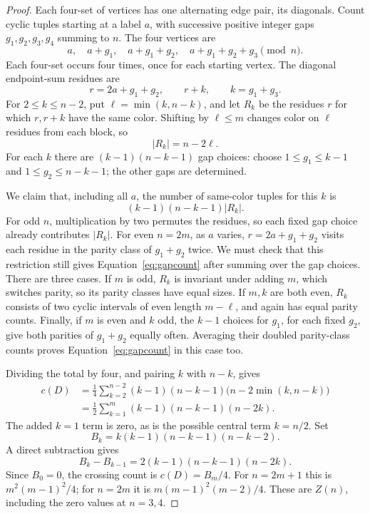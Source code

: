 \documentclass[11pt,a4paper]{article}
\theoremstyle{remark}
\numberwithin{equation}{section}
\begin{document}
\begin{proof}
Each four-set of vertices has one alternating edge pair, its
diagonals. Count cyclic tuples starting at a label \(a\), with
successive positive integer gaps \(g_1,g_2,g_3,g_4\) summing to \(n\).
The four vertices are
\[
 a,\quad a+g_1,\quad a+g_1+g_2,\quad a+g_1+g_2+g_3
 \pmod n.
\]
Each four-set occurs four times, once for each starting vertex.
The diagonal endpoint-sum residues are
\[
r=2a+g_1+g_2,\qquad r+k,\qquad k=g_1+g_3.
\]
For \(2\le k\le n-2\), put \(\ell=\min(k,n-k)\), and let \(R_k\)
be the residues \(r\) for which \(r,r+k\) have the same color.
Shifting by \(\ell\le m\) changes color on \(\ell\) residues from
each block, so
\[
|R_k|=n-2\ell.
\]
For each \(k\) there are \((k-1)(n-k-1)\) gap choices:
choose \(1\le g_1\le k-1\) and \(1\le g_2\le n-k-1\);
the other gaps are determined.

We claim that, including all \(a\), the number of same-color
tuples for this \(k\) is
\begin{equation}\label{eq:gapcount}
(k-1)(n-k-1)|R_k|.
\end{equation}
For odd \(n\), multiplication by two permutes the residues, so
each fixed gap choice already contributes \(|R_k|\).
For even \(n=2m\), as \(a\) varies, \(r=2a+g_1+g_2\) visits each
residue in the parity class of \(g_1+g_2\) twice. We must check that this restriction still gives
Equation~\eqref{eq:gapcount} after summing over the gap choices.
There are three cases.
If \(m\) is odd, \(R_k\) is invariant under adding \(m\), which
switches parity, so its parity classes have equal sizes.
If \(m,k\) are both even, \(R_k\) consists of two cyclic intervals
of even length \(m-\ell\), and again has equal parity counts.
Finally, if \(m\) is even and \(k\) odd, the \(k-1\) choices for
\(g_1\), for each fixed \(g_2\), give both parities of \(g_1+g_2\)
equally often. Averaging their doubled parity-class counts proves
Equation~\eqref{eq:gapcount} in this case too.

Dividing the total by four, and pairing \(k\) with \(n-k\), gives
\begin{align*}
c(D)
&=\frac14\sum_{k=2}^{n-2}
(k-1)(n-k-1)\bigl(n-2\min(k,n-k)\bigr)\\
&=\frac12\sum_{k=1}^{m}
(k-1)(n-k-1)(n-2k).
\end{align*}
The added \(k=1\) term is zero, as is the possible central
term \(k=n/2\). Set
\[
B_k=k(k-1)(n-k-1)(n-k-2).
\]
A direct subtraction gives
\[
B_k-B_{k-1}=2(k-1)(n-k-1)(n-2k).
\]
Since \(B_0=0\), the crossing count is \(c(D)=B_m/4\).
For \(n=2m+1\) this is \(m^2(m-1)^2/4\); for \(n=2m\)
it is \(m(m-1)^2(m-2)/4\). These are \(Z(n)\), including
the zero values at \(n=3,4\).
\end{proof}
\end{document}
